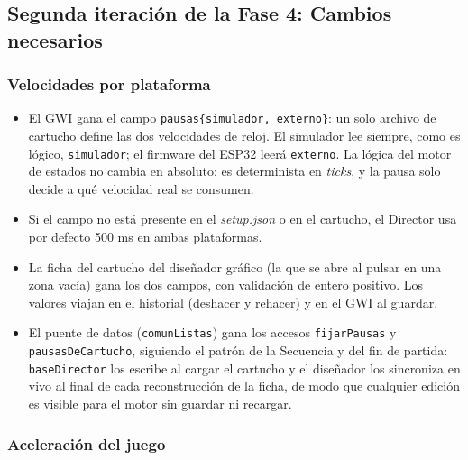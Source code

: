 \subsection{Segunda iteración de la Fase 4: Cambios necesarios}
\label{subsec:F4I2}

\subsubsection{Velocidades por plataforma}

\begin{itemize}
	\item El GWI gana el campo \texttt{pausas\{simulador, externo\}}: un
	solo archivo de cartucho define las dos velocidades de reloj. El
	simulador lee siempre, como es lógico, \texttt{simulador}; el firmware
	del ESP32 leerá \texttt{externo}. La lógica del motor de estados no
	cambia en absoluto: es determinista en \textit{ticks}, y la pausa solo
	decide a qué velocidad real se consumen.
	
	\item Si el campo no está presente en el \emph{setup.json} o en el
	cartucho, el Director usa por defecto 500 ms en ambas plataformas.
	
	\item La ficha del cartucho del diseñador gráfico (la que se abre al
	pulsar en una zona vacía) gana los dos campos, con validación de entero
	positivo. Los valores viajan en el historial (deshacer y rehacer) y en
	el GWI al guardar.
	
	\item El puente de datos (\texttt{comunListas}) gana los accesos
	\texttt{fijarPausas} y \texttt{pausasDeCartucho}, siguiendo el patrón de
	la Secuencia y del fin de partida: \texttt{baseDirector} los escribe al
	cargar el cartucho y el diseñador los sincroniza en vivo al final de cada
	reconstrucción de la ficha, de modo que cualquier edición es visible para
	el motor sin guardar ni recargar.
\end{itemize}

\subsubsection{Aceleración del juego}

